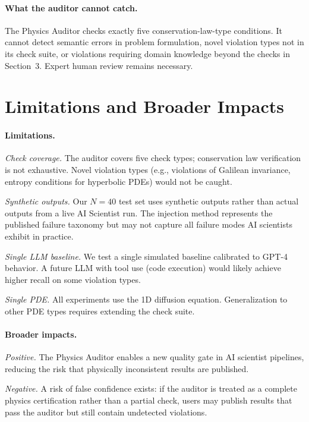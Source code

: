 \documentclass{article}
\begin{document}
\paragraph{What the auditor cannot catch.}
The Physics Auditor checks exactly five conservation-law-type conditions.
It cannot detect semantic errors in problem formulation, novel violation types
not in its check suite, or violations requiring domain knowledge beyond the
checks in Section~3.
Expert human review remains necessary.

\section{Limitations and Broader Impacts}

\paragraph{Limitations.}
\emph{Check coverage.} The auditor covers five check types; conservation law
verification is not exhaustive. Novel violation types (e.g., violations of
Galilean invariance, entropy conditions for hyperbolic PDEs) would not be caught.

\emph{Synthetic outputs.} Our $N=40$ test set uses synthetic outputs rather
than actual outputs from a live AI Scientist run. The injection method
represents the published failure taxonomy
\citep{Krishnapriyan2021Failures, Rathore2024Challenges} but may not capture
all failure modes AI scientists exhibit in practice.

\emph{Single LLM baseline.} We test a single simulated baseline calibrated to
GPT-4 behavior. A future LLM with tool use (code execution) would likely
achieve higher recall on some violation types.

\emph{Single PDE.} All experiments use the 1D diffusion equation.
Generalization to other PDE types requires extending the check suite.

\paragraph{Broader impacts.}
\emph{Positive.} The Physics Auditor enables a new quality gate in AI
scientist pipelines, reducing the risk that physically inconsistent results
are published.

\emph{Negative.} A risk of false confidence exists: if the auditor is treated
as a complete physics certification rather than a partial check, users may
publish results that pass the auditor but still contain undetected violations.
\end{document}

